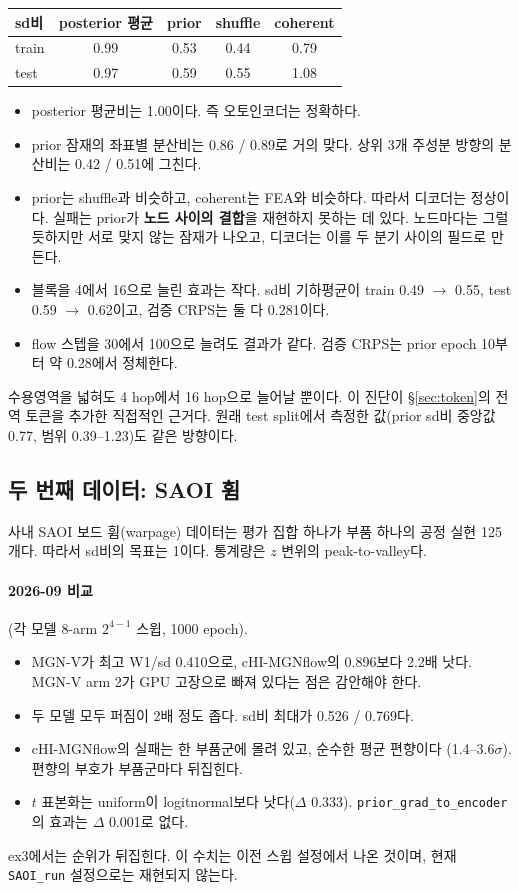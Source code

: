 \documentclass[11pt]{article}
\newcommand{\code}[1]{\texttt{#1}}
\begin{document}
\begin{center}
\small
\begin{tabular}{@{}lcccc@{}}
\toprule
sd비 & posterior 평균 & prior & shuffle & coherent \\
\midrule
train & 0.99 & 0.53 & 0.44 & 0.79 \\
test & 0.97 & 0.59 & 0.55 & 1.08 \\
\bottomrule
\end{tabular}
\end{center}
\begin{itemize}
\item posterior 평균비는 1.00이다. 즉 오토인코더는 정확하다.
\item prior 잠재의 좌표별 분산비는 0.86 / 0.89로 거의 맞다. 상위 3개 주성분
  방향의 분산비는 0.42 / 0.51에 그친다.
\item prior는 shuffle과 비슷하고, coherent는 FEA와 비슷하다. 따라서 디코더는
  정상이다. 실패는 prior가 \textbf{노드 사이의 결합}을 재현하지 못하는 데 있다.
  노드마다는 그럴듯하지만 서로 맞지 않는 잠재가 나오고, 디코더는 이를 두 분기
  사이의 필드로 만든다.
\item 블록을 4에서 16으로 늘린 효과는 작다. sd비 기하평균이 train 0.49
  $\to$ 0.55, test 0.59 $\to$ 0.62이고, 검증 CRPS는 둘 다 0.281이다.
\item flow 스텝을 30에서 100으로 늘려도 결과가 같다. 검증 CRPS는 prior epoch
  10부터 약 0.28에서 정체한다.
\end{itemize}
수용영역을 넓혀도 4 hop에서 16 hop으로 늘어날 뿐이다. 이 진단이
\S\ref{sec:token}의 전역 토큰을 추가한 직접적인 근거다. 원래 test split에서
측정한 값(prior sd비 중앙값 0.77, 범위 0.39--1.23)도 같은 방향이다.

\subsection{두 번째 데이터: SAOI 휨}\label{sec:saoi}

사내 SAOI 보드 휨(warpage) 데이터는 평가 집합 하나가 부품 하나의 공정 실현
125개다. 따라서 sd비의 목표는 1이다. 통계량은 $z$ 변위의 peak-to-valley다.

\paragraph{2026-09 비교} (각 모델 8-arm $2^{4-1}$ 스윕, 1000 epoch).
\begin{itemize}
\item MGN-V가 최고 W1/sd 0.410으로, cHI-MGNflow의 0.896보다 2.2배 낫다.
  MGN-V arm 2가 GPU 고장으로 빠져 있다는 점은 감안해야 한다.
\item 두 모델 모두 퍼짐이 2배 정도 좁다. sd비 최대가 0.526 / 0.769다.
\item cHI-MGNflow의 실패는 한 부품군에 몰려 있고, 순수한 평균 편향이다
  (1.4--3.6$\sigma$). 편향의 부호가 부품군마다 뒤집힌다.
\item $t$ 표본화는 uniform이 logitnormal보다 낫다($\Delta$ 0.333).
  \code{prior\_grad\_to\_encoder}의 효과는 $\Delta$ 0.001로 없다.
\end{itemize}
ex3에서는 순위가 뒤집힌다. 이 수치는 이전 스윕 설정에서 나온 것이며, 현재
\code{SAOI\_run} 설정으로는 재현되지 않는다.
\end{document}
